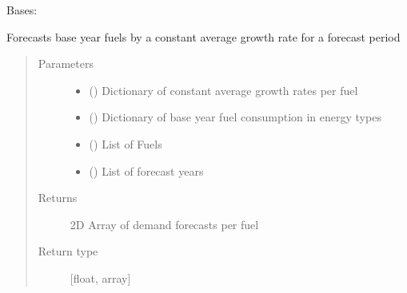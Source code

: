 \documentclass[a4paper,12pt,english]{article}
\begin{document}
\begin{fulllineitems}
\label{\detokenize{GOCPI:GOCPI.Forecasting.Forecasting}}
Bases: 

\begin{fulllineitems}
\label{\detokenize{GOCPI:GOCPI.Forecasting.Forecasting.calculate_cagr_forecasts}}
Forecasts base year fuels by a constant average growth rate for a forecast period
\begin{quote}\begin{description}
\item[{Parameters}] \leavevmode\begin{itemize}
\item {} 
 () \textendash{} Dictionary of constant average growth rates per fuel

\item {} 
 (\sphinxstyleliteralemphasis{\sphinxupquote{{[}}}\sphinxstyleliteralemphasis{\sphinxupquote{{]}}}) \textendash{} Dictionary of base year fuel consumption in energy types

\item {} 
 () \textendash{} List of Fuels

\item {} 
 () \textendash{} List of forecast years

\end{itemize}

\item[{Returns}] \leavevmode
2D Array of demand forecasts per fuel

\item[{Return type}] \leavevmode
{[}float, array{]}


\end{description}
\end{quote}
\end{fulllineitems}
\end{fulllineitems}
\end{document}
